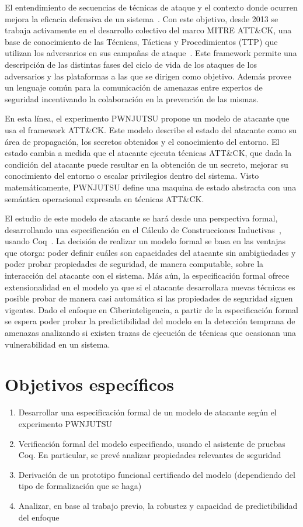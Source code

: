 \documentclass[a4paper,12pt]{article}
\begin{document}
El entendimiento de secuencias de técnicas de ataque y el contexto donde ocurren mejora la eficacia defensiva de un sistema~\cite{attack-flow}. Con este objetivo, desde 2013 se trabaja activamente en el desarrollo colectivo del marco MITRE ATT\&CK, una base de conocimiento de las Técnicas, Tácticas y Procedimientos (TTP) que utilizan los adversarios en sus campañas de ataque~\cite{mitre-attack}. Este framework permite una descripción de las distintas fases del ciclo de vida de los ataques de los adversarios y las plataformas a las que se dirigen como objetivo. Además provee un lenguaje común para la comunicación de amenazas entre expertos de seguridad incentivando la colaboración en la prevención de las mismas.

En esta línea, el experimento PWNJUTSU propone un modelo de atacante que usa el framework ATT\&CK. Este modelo describe el estado del atacante como su área de propagación, los secretos obtenidos y el conocimiento del entorno. El estado cambia a medida que el atacante ejecuta técnicas ATT\&CK, que dada la condición del atacante puede resultar en la obtención de un secreto, mejorar su conocimiento del entorno o escalar privilegios dentro del sistema. Visto matemáticamente, PWNJUTSU define una maquina de estado abstracta con una semántica operacional expresada en técnicas ATT\&CK.

El estudio de este modelo de atacante se hará desde una perspectiva formal, desarrollando una especificación en el Cálculo de Construcciones Inductivas~\cite{coquand:88}, usando Coq~\cite{coqart}. La decisión de realizar un modelo formal se basa en las ventajas que otorga: poder definir cuáles son capacidades del atacante sin ambigüedades y poder probar propiedades de seguridad, de manera computable, sobre la interacción del atacante con el sistema. Más aún, la especificación formal ofrece extensionalidad en el modelo ya que si el atacante desarrollara nuevas técnicas es posible probar de manera casi automática si las propiedades de seguridad siguen vigentes. Dado el enfoque en Ciberinteligencia, a partir de la especificación formal se espera poder probar la predictibilidad del modelo en la detección temprana de amenazas analizando si existen trazas de ejecución de técnicas que ocasionan una vulnerabilidad en un sistema.

\section{Objetivos específicos}
\begin{enumerate}
    \item Desarrollar una especificación formal de un modelo de atacante según el experimento PWNJUTSU
    \item Verificación formal del modelo especificado, usando el asistente de pruebas Coq. En particular, se prevé analizar propiedades relevantes de seguridad
    \item Derivación de un prototipo funcional certificado del modelo (dependiendo del tipo de formalización que se haga)
    \item Analizar, en base al trabajo previo, la robustez y capacidad de predictibilidad del enfoque
\end{enumerate}
\end{document}
